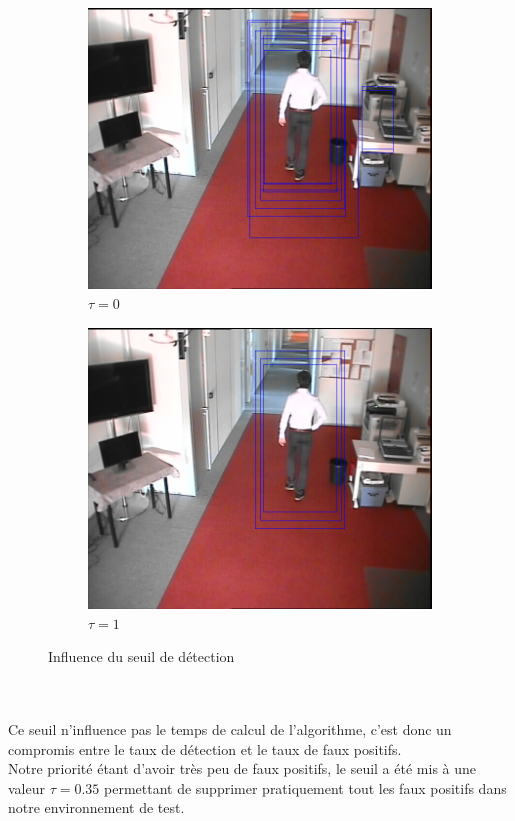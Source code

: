 \documentclass[12pt]{article}
\begin{document}
\begin{figure}[!ht]
	\centering
	\begin{subfigure}{.45\textwidth}
		\centering
		\includegraphics[clip=true,trim=300 100 50 0,width=\linewidth]{img/tau0.png}
		\caption{$\tau=0$}
	\end{subfigure}
	\begin{subfigure}{.45\textwidth}
		\centering
		\includegraphics[clip=true,trim=300 100 50 0,width=\linewidth]{img/tau1.png}
		\caption{$\tau=1$}
	\end{subfigure}
	\caption{Influence du seuil de détection}
	\label{fig:seuil}
\end{figure}\\
\\
Ce seuil n'influence pas le temps de calcul de l'algorithme, c'est donc un compromis entre le taux de détection et le taux de faux positifs. \\Notre priorité étant d'avoir très peu de faux positifs, le seuil a été mis à une valeur $\tau=0.35$ permettant de supprimer pratiquement tout les faux positifs dans notre environnement de test.
\end{document}
